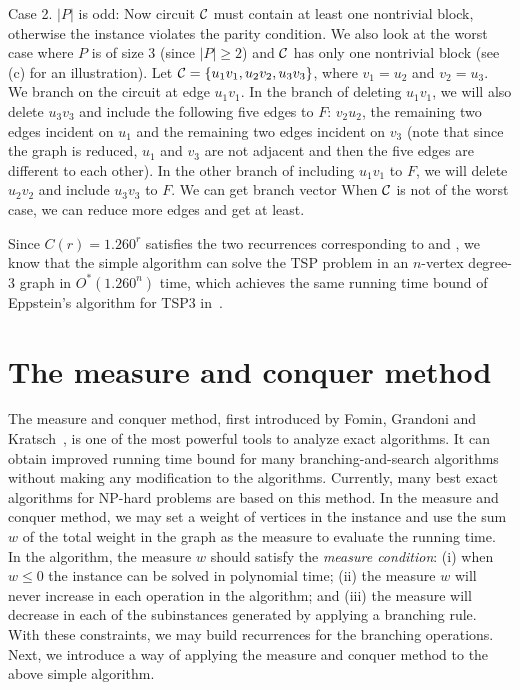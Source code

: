 \documentclass[runningheads]{llncs}
\begin{document}
 Case 2. $|P|$ is odd: Now circuit ${\cal C}$ must contain  at least one nontrivial block, otherwise the instance violates the parity condition. We also look at the worst case where $P$ is of size 3 (since $|P|\geq2$) and  ${\cal C}$ has only one nontrivial block (see (c) for an illustration). Let ${\cal C}=\{u_1v_1,u_2v_2, u_3v_3\}$, where $v_1=u_2$ and $v_2=u_3$.
We branch on the circuit at edge $u_1v_1$.
In the branch of deleting $u_1v_1$, we will also delete $u_3v_3$  and include the following five edges to $F$: $v_2u_2$, the remaining two edges incident on $u_1$ and the remaining two edges incident on $v_3$ (note that since the graph is reduced, $u_1$ and $v_3$ are not adjacent and then the five edges are different to each other). In the other branch of including $u_1v_1$ to $F$, we will delete $u_2v_2$ and include $u_3v_3$ to $F$. We can get branch vector
  When ${\cal C}$ is not of the worst case, we can reduce more edges and get  at least.

 Since $C(r)=1.260^r$ satisfies the two recurrences corresponding to  and , we know that the simple algorithm can solve the TSP problem in an $n$-vertex degree-3 graph in $O^*(1.260^n)$ time, which achieves the same running time bound of Eppstein's algorithm for TSP3 in~\cite{Eppstein:TSP3}.


\section{The measure and conquer method}\label{sec_MaC}
The measure and conquer method, first introduced by  Fomin, Grandoni and Kratsch~\cite{kn:fomin2}, is one of the most powerful tools to analyze exact algorithms.
It can obtain improved running time bound for many branching-and-search algorithms without making any modification to the algorithms. Currently, many best exact algorithms for NP-hard problems are based on this method.
In the measure and conquer method, we may
set a weight of vertices in the instance and use the sum $w$ of the total weight in the graph as the measure
to evaluate the running time. In the algorithm, the measure $w$ should satisfy the \emph{measure condition}: (i) when $w\leq0$ the instance can be solved in polynomial time;
(ii) the measure $w$ will never increase in each operation in the algorithm; and (iii) the measure will decrease in each of the subinstances generated by applying a branching rule. With these constraints, we may build recurrences for the branching operations.
Next, we introduce a way of applying the measure and conquer method to the above simple algorithm.
\end{document}
